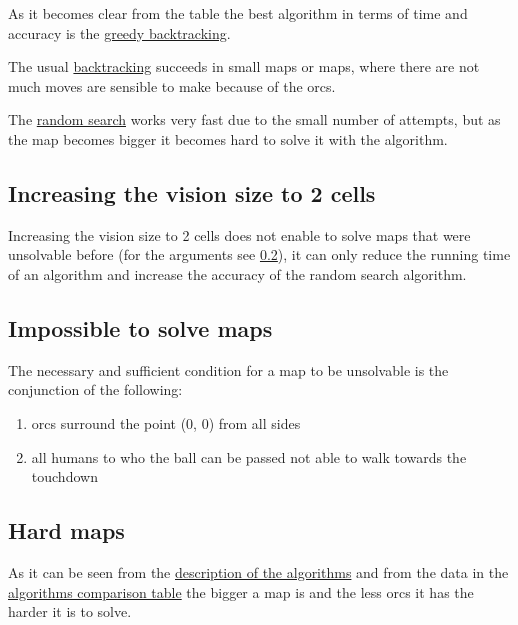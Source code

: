 \documentclass[a4paper, oneside, titlepage]{article}
\begin{document}
\bigskip

As it becomes clear from the table the best algorithm in terms of time and accuracy is the \hyperref[sec:alg:greedy_backtracking]{greedy backtracking}.

The usual \hyperref[sec:alg:backtracking]{backtracking} succeeds in small maps or maps, where there are not much moves are sensible to make because of the orcs.

The \hyperref[sec:alg:random]{random search} works very fast due to the small number of attempts, but as the map becomes bigger it becomes hard to solve it with the algorithm.

\subsection{Increasing the vision size to 2 cells}

Increasing the vision size to 2 cells does not enable to solve maps that were unsolvable before (for the arguments see \ref{sec:impossible_map}), it can only reduce the running time of an algorithm and increase the accuracy of the random search algorithm.

\subsection{Impossible to solve maps} \label{sec:impossible_map}

The necessary and sufficient condition for a map to be unsolvable is the conjunction of the following:

\begin{enumerate}
    \item orcs surround the point (0, 0) from all sides
    \item all humans to who the ball can be passed not able to walk towards the touchdown
\end{enumerate}

\subsection{Hard maps}
As it can be seen from the \hyperref[sec:algorithms_description]{description of the algorithms} and from the data in the \hyperref[table:algorithms_comparison]{algorithms comparison table} the bigger a map is and the less orcs it has the harder it is to solve.
\end{document}
